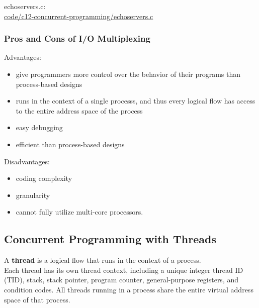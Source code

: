 \documentclass[11pt]{article}
\begin{document}
echoservers.c:\\
\url{code/c12-concurrent-programming/echoservers.c}\\



\subsubsection{Pros and Cons of I/O Multiplexing}
\label{sec:org5dbcd54}
Advantages:\\
\begin{itemize}
\item give programmers more control over the behavior of their programs than process-based designs\\
\item runs in the context of a single processs, and thus every logical flow has access to the entire address space of the process\\
\item easy debugging\\
\item efficient than process-based designs\\
\end{itemize}

Disadvantages:\\
\begin{itemize}
\item coding complexity\\
\item granularity\\
\item cannot fully utilize multi-core processors.\\
\end{itemize}



\subsection{Concurrent Programming with Threads}
\label{sec:orgd253b62}

A \textbf{thread} is a logical flow that runs in the context of a process.\\

Each thread has its own thread context, including a unique integer thread ID (TID), stack, stack pointer, program counter, general-purpose registers, and condition codes. All threads running in a process share the entire virtual address space of that process.\\
\end{document}
